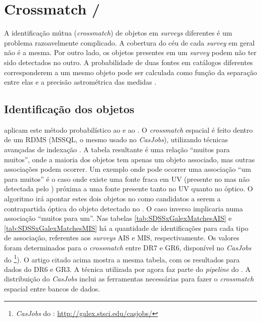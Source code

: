 
\section{Crossmatch \SDSS/\galex}

A identificação mútua ({\em crossmatch}) de objetos em {\em surveys} diferentes
é um problema razoavelmente complicado. A cobertura do céu de cada {\em survey}
em geral não é a mesma. Por outro lado, os objetos presentes em um {\em survey}
podem não ter sido detectados no outro. A probabilidade de duas fontes em
catálogos diferentes corresponderem a um mesmo objeto pode ser calculada como
função da separação entre elas e a precisão astrométrica das medidas
\citep{Budavari2008}.

\subsection{Identificação dos objetos}
\label{sec:Crossmatch:SDSSGalex:Identificacao}

\citet{Budavari2009} aplicam este método probabilístico ao \SDSS e ao \galex. O
{\em crossmatch} espacial é feito dentro de um RDMS (MSSQL, o mesmo usado no
{\em CasJobs}), utilizando técnicas avançadas de indexação \citep{Kunszt2000}. A
tabela resultante é uma relação ``muitos para muitos'', onde a maioria dos
objetos \galex tem apenas um objeto \SDSS associado, mas outras associações
podem ocorrer. Um exemplo onde pode ocorrer uma associação ``um para muitos'' é
o caso onde existe uma fonte fraca em UV (presente no \SDSS mas não detectada
pelo \galex) próxima a uma fonte presente tanto no UV quanto no óptico. O
algoritmo irá apontar estes dois objetos no \SDSS como candidatos a serem a
contrapartida óptica do objeto detectado no \galex. O caso inverso implicaria
numa associação ``muitos para um''. Nas tabelas \ref{tab:SDSSxGalexMatchesAIS} e
\ref{tab:SDSSxGalexMatchesMIS} há a quantidade de identificações para cada tipo
de associação, referentes aos {\em surveys} AIS e MIS, respectivamente. Os
valores foram determinados para o {\em crossmatch} entre \SDSS DR7 e \galex GR6,
disponível no {\em CasJobs} do \galex\footnote{{\em CasJobs} do \galex:
\url{http://galex.stsci.edu/casjobs/}}). O artigo citado acima mostra a mesma
tabela, com os resultados para dados do \SDSS DR6 e \galex GR3. A técnica
utilizada por \citeauthor{Budavari2009} agora faz parte do {\em pipeline} do
\galex. A distribuição do {\em CasJobs} inclui as ferramentas necessárias para
fazer o {\em crossmatch} espacial entre bancos de dados.

